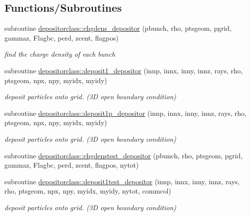 \subsection*{Functions/\+Subroutines}
\begin{DoxyCompactItemize}
\item 
subroutine \mbox{\hyperlink{namespacedepositorclass_adea4a5f5ed3c85a2ef236eaa94f10b98}{depositorclass\+::chgdens\+\_\+depositor}} (pbunch, rho, ptsgeom, pgrid, gammaz, Flagbc, perd, zcent, flagpos)
\begin{DoxyCompactList}\small\item\em find the charge density of each bunch \end{DoxyCompactList}\item 
subroutine \mbox{\hyperlink{namespacedepositorclass_acb64300f2b31d40a2d4741c4475ae10a}{depositorclass\+::deposit1\+\_\+depositor}} (innp, innx, inny, innz, rays, rho, ptsgeom, npx, npy, myidx, myidy)
\begin{DoxyCompactList}\small\item\em deposit particles onto grid. (3D open boundary condition) \end{DoxyCompactList}\item 
subroutine \mbox{\hyperlink{namespacedepositorclass_a1f57e8a4537070af145a196172e3ba85}{depositorclass\+::deposit1p\+\_\+depositor}} (innp, innx, inny, innz, rays, rho, ptsgeom, npx, npy, myidx, myidy)
\begin{DoxyCompactList}\small\item\em deposit particles onto grid. (3D open boundary condition) \end{DoxyCompactList}\item 
subroutine \mbox{\hyperlink{namespacedepositorclass_a258e6305ffaed5752f7eaa0584e2e6d8}{depositorclass\+::chgdenstest\+\_\+depositor}} (pbunch, rho, ptsgeom, pgrid, gammaz, Flagbc, perd, zcent, flagpos, nytot)
\item 
subroutine \mbox{\hyperlink{namespacedepositorclass_aaa31c3a30e6e83ab67ee89344612328c}{depositorclass\+::deposit1test\+\_\+depositor}} (innp, innx, inny, innz, rays, rho, ptsgeom, npx, npy, myidx, myidy, nytot, commcol)
\begin{DoxyCompactList}\small\item\em deposit particles onto grid. (3D open boundary condition) \end{DoxyCompactList}\end{DoxyCompactItemize}
